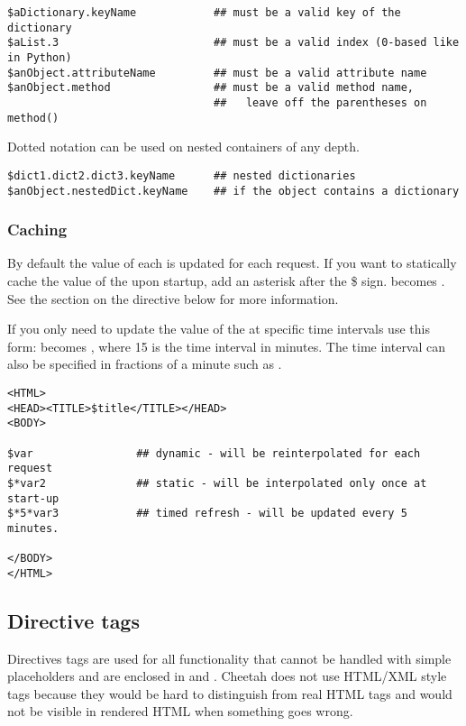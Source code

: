 \begin{verbatim}
$aDictionary.keyName            ## must be a valid key of the dictionary 
$aList.3                        ## must be a valid index (0-based like in Python)
$anObject.attributeName         ## must be a valid attribute name
$anObject.method                ## must be a valid method name, 
                                ##   leave off the parentheses on method()
\end{verbatim}


Dotted notation can be used on nested containers of any depth.
\begin{verbatim}
$dict1.dict2.dict3.keyName      ## nested dictionaries
$anObject.nestedDict.keyName    ## if the object contains a dictionary
\end{verbatim}


\subsubsection{Caching}

By default the value of each  is updated for each request.
If you want to statically cache the value of the  upon
startup, add an asterisk after the \$ sign.   becomes .
See the section on the  directive below for more information.

If you only need to update the value of the  at specific time intervals use
this form:  becomes  , where 15 is the time interval in
minutes.  The time interval can also be specified in fractions of a minute such
as .

\begin{verbatim}
<HTML>
<HEAD><TITLE>$title</TITLE></HEAD>
<BODY>

$var                ## dynamic - will be reinterpolated for each request
$*var2              ## static - will be interpolated only once at start-up
$*5*var3            ## timed refresh - will be updated every 5 minutes.

</BODY>
</HTML>
\end{verbatim}


\subsection{Directive tags}
Directives tags are used for all functionality that cannot be handled with
simple placeholders and are enclosed in \code{\#} and \code{/\#}.
Cheetah does not use HTML/XML style tags because they would be hard to
distinguish from real HTML tags and would not be visible in rendered HTML when
something goes wrong.

